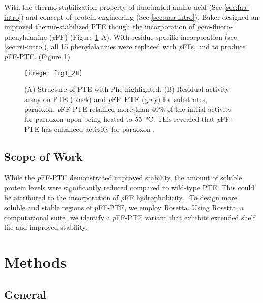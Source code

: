 \begin{refsection}
With the thermo-stabilization property of fluorinated amino acid (See
\ref{sec:faa-intro}) and concept of protein engineering (See \ref{sec:uaa-intro}),
Baker  designed an improved thermo-stabilized PTE though the
incorporation of \emph{para}-fluoro-phenylalanine (\emph{p}FF)
\cite{Baker2011b} (Figure \ref{fig:PJB} A). With residue specific incorporation
(see \ref{sec:rsi-intro}), all 15 phenylalanines were replaced with \emph{p}FFs,
and to produce \emph{p}FF-PTE. (Figure
\ref{fig:PJB})
\begin{figure}[htbp] \centering \texttt{[image: fig1\_28]}
    \caption[(A) Structure of PTE with Phe highlighted. (B) Residual activity
        assay on PTE (black) and \emph{p}FF-PTE (gray) for substrates,
        paraoxon. \emph{p}FF-PTE retained more than 40\% of the initial
        activity for paraoxon upon being heated to \SI{55}{\celsius}. This
        revealed that \emph{p}FF-PTE has enhanced activity for paraoxon.]{(A)
            Structure of PTE with Phe highlighted. (B) Residual activity assay
            on PTE (black) and \emph{p}FF--PTE (gray) for substrates, paraoxon.
            \emph{p}FF-PTE retained more than 40\% of the initial activity for
            paraoxon upon being heated to \SI{55}{\celsius}. This revealed that
            \emph{p}FF-PTE has enhanced activity for paraoxon
            \cite{Baker2011b}.} 
    \label{fig:PJB} 
\end{figure}

\subsection{Scope of Work}

While the \emph{p}FF-PTE demonstrated improved stability, the amount of soluble
protein levels were significantly reduced compared to wild-type PTE. This could
be attributed to the incorporation of \emph{p}FF hydrophobicity
\cite{Baker2011b}. To design more soluble and stable regions of \emph{p}FF-PTE,
we employ Rosetta. Using Rosetta, a computational suite, we identify a
\emph{p}FF-PTE variant that exhibits extended shelf life and improved
stability. 

\section{Methods}

\subsection{General}


\end{refsection}
